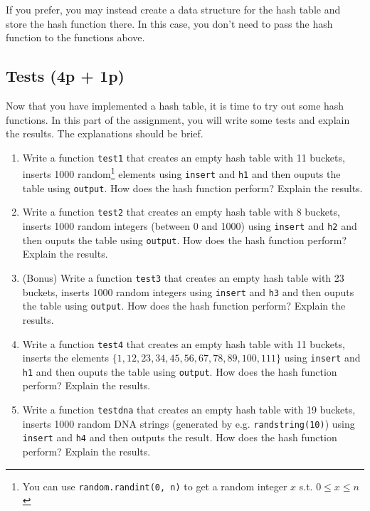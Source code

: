 \documentclass{article}
\newcommand{\mset}[1]{\lbrace #1 \rbrace}
\begin{document}
If you prefer, you may instead create a data structure for the hash table and store the hash function there. In this case, you don't need to pass
the hash function to the functions above.

\subsection{Tests {\bf (4p + 1p)}}

Now that you have implemented a hash table, it is time to try out some hash functions.
In this part of the assignment, you will write some tests and explain the results. The explanations should be brief.

\begin{enumerate}
\item Write a function \lstinline{test1} that creates an empty hash table with 11 buckets, inserts 1000 random\footnote{You can use \lstinline{random.randint(0, n)} to get a random integer $x$ s.t. $0 \leq x \leq n$}
 elements using \lstinline{insert} and \lstinline{h1} and then ouputs the
table using \lstinline{output}. How does the hash function perform? Explain the results.

\item Write a function \lstinline{test2} that creates an empty hash table with 8 buckets, inserts 1000 random
 integers (between 0 and 1000) using \lstinline{insert} and \lstinline{h2} and then ouputs the
table using \lstinline{output}. How does the hash function perform? Explain the results.

\item (Bonus) Write a function \lstinline{test3} that creates an empty hash table with 23 buckets, inserts 1000 random
 integers using \lstinline{insert} and \lstinline{h3} and then ouputs the
table using \lstinline{output}. How does the hash function perform? Explain the results. 

\item Write a function \lstinline{test4} that creates an empty hash table with 11 buckets, 
inserts the elements $\mset{1, 12, 23, 34, 45, 56, 67, 78, 89, 100, 111}$
using \lstinline{insert} and \lstinline{h1} and then ouputs the
table using \lstinline{output}. How does the hash function perform? Explain the results.

\item Write a function \lstinline{testdna} that creates an empty hash table with 19 buckets, 
inserts 1000 random DNA strings (generated by e.g. \lstinline{randstring(10)}) using \lstinline{insert} and \lstinline{h4}
and then outputs the result. How does the hash function perform? Explain the results.

\end{enumerate}
\end{document}
